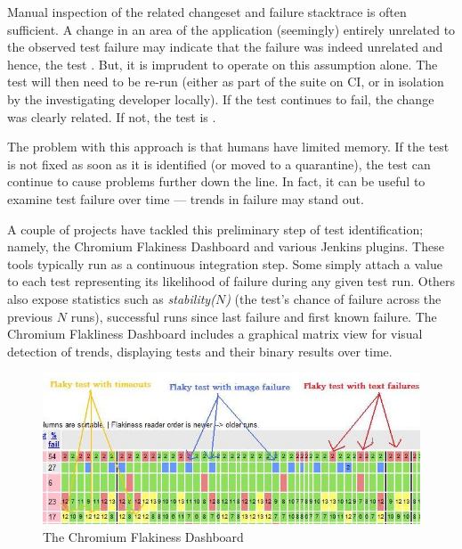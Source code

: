 Manual inspection of the related changeset and failure stacktrace is often
sufficient. A change in an area of the application (seemingly) entirely
unrelated to the observed test failure may indicate that the failure was indeed
unrelated and hence, the test \flaky. But, it is imprudent to operate on this
assumption alone. The test will then need to be re-run (either as part of the
suite on CI, or in isolation by the investigating developer locally). If the
test continues to fail, the change was clearly related. If not, the test is
\flaky.

The problem with this approach is that humans have limited memory. If the \flaky
test is not fixed as soon as it is identified (or moved to a quarantine), the
test can continue to cause problems further down the line. In fact, it can be
useful to examine test failure over time --- trends in failure may stand out.

A couple of projects have tackled this preliminary step of \flaky test
identification; namely, the Chromium Flakiness Dashboard
\cite{flakinessDashboard} and various Jenkins plugins. These tools typically run
as a continuous integration step. Some simply attach a value to each test
representing its likelihood of failure during any given test run. Others also
expose statistics such as \emph{stability($N$)} (the test's chance of failure
across the previous $N$ runs), successful runs since last failure and first
known failure. The Chromium Flakliness Dashboard includes a graphical matrix
view for visual detection of trends, displaying tests and their binary results
over time.

\begin{figure}[H]

\includegraphics[width=\linewidth]{Images/chromium_flaky_dashboard}

\caption{The Chromium Flakiness Dashboard \cite{flakinessDashboard}}
\label{fig:chromium_dashboard}
\end{figure}

